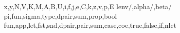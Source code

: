 \renewcommand{\tcolor}[1]{\mathcolor{OrangeRed}{#1}}

\newcommand{\hhw}[1]{\boldsymbol{\langle}\!\boldsymbol{\langle}#1\boldsymbol{\rangle}\!\boldsymbol{\rangle}}

\newcommand{\hsubst}[3]{#1[#2/\!/#3]}

{x,y,N,V,K,M,A,B,U,i,f,j,e,C,k,z,v,p,E}
{lenv/\Gamma,alpha/\alpha,beta/\beta}
{pi,fun,sigma,type,dpair,sum,prop,bool}
{fun,app,let,fst,snd,dpair,pair,sum,case,coe,true,false,if,nlet}

\newcommand{\tinje}{\tsume}

\newcommand{\tstepjudg}[4][\mapsto]{#3 #1 #4}
\newcommand{\tequivjudg}{\sequivjudg}
\newcommand{\tsubtyjudg}{\ssubtyjudg}
\newcommand{\ttyjudg}{\styjudg}
\newcommand{\twf}{\swf}

\newcommand{\anfslang}{ECC$^{D}$\xspace}
\newcommand{\anftlang}{ECC$^{A}$\xspace}
\newcommand{\anf}[2]{\sembrace{#1}{#2}}
\newcommand{\anfh}[1]{\sembrace{#1}}

\newcommand{\teval}[1]{\tfont{eval}(#1)}

\newcommand{\sbound}[1]{\mathcal{ST}(#1)}

\newcommand{\tedefs}[1]{\mathtt{defs}{({#1})}}
\newcommand{\edefs}[1]{\tedefs{\anfh{#1}}}

\newcommand{\tehole}[1]{\mathtt{hole}{({#1})}}
\newcommand{\ehole}[1]{\tehole{\anfh{#1}}}

\newcommand{\absccslang}{ECC$^{D}$\xspace}
\newcommand{\abscctlang}{ECC$^{CC}$\xspace}
\newcommand{\absccmodel}[1]{\sembrace{#1}^{\circ}}
\newcommand{\modelsym}{\leadsto_{\circ}}
\newcommand{\mjudg}[4]{\judg{#1}{#2}{#3 \mathbin{\modelsym} #4}}

\newcommand{\sNat}{\sfont{Nat}}
\newcommand{\sS}{\sfont{S}}

\makeatletter
\renewcommand{\@existty}[3]{
  \kwopen{\langsymfont{\exists}}%
  {#1} \mathbin{:} {#2}%
  \mathclose{.}%
  \mathpunct{}#3%
}
\makeatother

\newcommand{\codety}[4]{
  \kwopen{#2{Code}}(#3)\mathpunct{.}#4%
}

\newcommand{\cloe}[4]{
  #2{\langle\!\langle}#3\mathpunct{#2{,}}#4#2{\rangle\!\rangle}%
}

